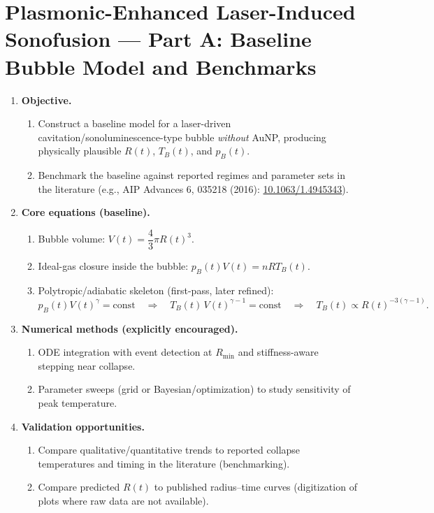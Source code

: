 \documentclass[11pt]{article}
\begin{document}
	\tableofcontents
	\newpage
	
	\section{Plasmonic-Enhanced Laser-Induced Sonofusion --- Part A: Baseline Bubble Model and Benchmarks}
	\begin{enumerate}
		\item \textbf{Objective.}
		\begin{enumerate}
			\item Construct a baseline model for a laser-driven cavitation/sonoluminescence-type bubble \emph{without} AuNP, producing physically plausible \(R(t)\), \(T_B(t)\), and \(p_B(t)\).
			\item Benchmark the baseline against reported regimes and parameter sets in the literature (e.g., AIP Advances 6, 035218 (2016): \href{https://doi.org/10.1063/1.4945343}{10.1063/1.4945343}).
		\end{enumerate}
		
		\item \textbf{Core equations (baseline).}
		\begin{enumerate}
			\item Bubble volume: \(V(t)=\dfrac{4}{3}\pi R(t)^3\).
			\item Ideal-gas closure inside the bubble: \(p_B(t)V(t)=nRT_B(t)\).
			\item Polytropic/adiabatic skeleton (first-pass, later refined):
			\[
			p_B(t) V(t)^{\gamma} = \text{const}
			\quad\Rightarrow\quad
			T_B(t)\,V(t)^{\gamma-1}=\text{const}
			\quad\Rightarrow\quad
			T_B(t)\propto R(t)^{-3(\gamma-1)}.
			\]
		\end{enumerate}
		
		\item \textbf{Numerical methods (explicitly encouraged).}
		\begin{enumerate}
			\item ODE integration with event detection at \(R_{\min}\) and stiffness-aware stepping near collapse.
			\item Parameter sweeps (grid or Bayesian/optimization) to study sensitivity of peak temperature.
		\end{enumerate}
		
		\item \textbf{Validation opportunities.}
		\begin{enumerate}
			\item Compare qualitative/quantitative trends to reported collapse temperatures and timing in the literature (benchmarking).
			\item Compare predicted \(R(t)\) to published radius--time curves (digitization of plots where raw data are not available).
		\end{enumerate}
		

\end{enumerate}
\end{document}
